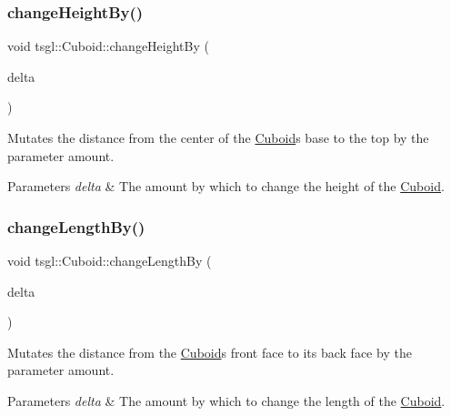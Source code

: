 \subsubsection{\texorpdfstring{change\+Height\+By()}{changeHeightBy()}}
{\footnotesize\ttfamily void tsgl\+::\+Cuboid\+::change\+Height\+By (\begin{DoxyParamCaption}\item[{G\+Lfloat}]{delta }\end{DoxyParamCaption})\hspace{0.3cm}{\ttfamily [virtual]}}



Mutates the distance from the center of the \hyperlink{classtsgl_1_1_cuboid}{Cuboid}\textquotesingle{}s base to the top by the parameter amount. 


\begin{DoxyParams}{Parameters}
{\em delta} & The amount by which to change the height of the \hyperlink{classtsgl_1_1_cuboid}{Cuboid}. \\
\hline
\end{DoxyParams}
\mbox{\label{classtsgl_1_1_cuboid_ac8b9e098acd3b46dafae304f1288aa3d}} 
\subsubsection{\texorpdfstring{change\+Length\+By()}{changeLengthBy()}}
{\footnotesize\ttfamily void tsgl\+::\+Cuboid\+::change\+Length\+By (\begin{DoxyParamCaption}\item[{G\+Lfloat}]{delta }\end{DoxyParamCaption})\hspace{0.3cm}{\ttfamily [virtual]}}



Mutates the distance from the \hyperlink{classtsgl_1_1_cuboid}{Cuboid}\textquotesingle{}s front face to its back face by the parameter amount. 


\begin{DoxyParams}{Parameters}
{\em delta} & The amount by which to change the length of the \hyperlink{classtsgl_1_1_cuboid}{Cuboid}. \\
\hline
\end{DoxyParams}
\mbox{\label{classtsgl_1_1_cuboid_a72470bd9e57eb12440883ff69b5a9bc4}} 
